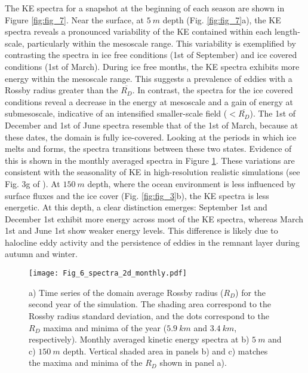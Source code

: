 \documentclass[draft]{agujournal2019}
\begin{document}
The KE spectra for a snapshot at the beginning of each season are shown in Figure \ref{fig:fig_7}. Near the surface, at $5\ m$ depth (Fig. \ref{fig:fig_7}a), the KE spectra reveals a pronounced variability of the KE contained within each length-scale, particularly within the mesoscale range. This variability is exemplified by contrasting the spectra in ice free conditions (1st of September) and ice covered conditions (1st of March). 
During ice free months, the KE spectra exhibits more energy within the mesoscale range. This suggests a prevalence of eddies with a Rossby radius greater than the $\overline{R_{D}}$. In contrast, the spectra for the ice covered conditions reveal a decrease in the energy at mesoscale and a gain of energy at submesoscale, indicative of an intensified smaller-scale field ($<\overline{R_{D}}$). The 1st of December and 1st of June spectra resemble that of the 1st of March, because at these dates, the domain is fully ice-covered. Looking at the periods in which ice melts and forms, the spectra transitions between these two states. Evidence of this is shown in the monthly averaged spectra in Figure \ref{fig:fig_6}. These variations are consistent with the seasonality of KE in high-resolution realistic simulations (see Fig. 3g of \citealt{Manucharyan_eddies_2022}). At $150\ m$ depth, where the ocean environment is less influenced by surface fluxes and the ice cover (Fig. \ref{fig:fig_3}b), the KE spectra is less energetic. At this depth, a clear distinction emerges: September 1st and December 1st exhibit more energy across most of the KE spectra, whereas March 1st and June 1st show weaker energy levels. This difference is likely due to halocline eddy activity and the persistence of eddies in the remnant layer during autumn and winter.


\begin{figure}[h]
  \texttt{[image: Fig\_6\_spectra\_2d\_monthly.pdf]}
  \caption{a) Time series of the domain average Rossby radius ($R_D$) for the second year of the simulation. The shading area correspond to the Rossby radius standard deviation, and the dots correspond to the $R_D$ maxima and minima of the year ($5.9\ km$  and $3.4\ km$, respectively).
  Monthly averaged kinetic energy spectra at b) $5\ m$ and c) $150\ m$ depth. Vertical shaded area in panels b) and c) matches the maxima and minima of the $R_D$ shown in panel a).}
  \label{fig:fig_6}
\end{figure}
\end{document}
